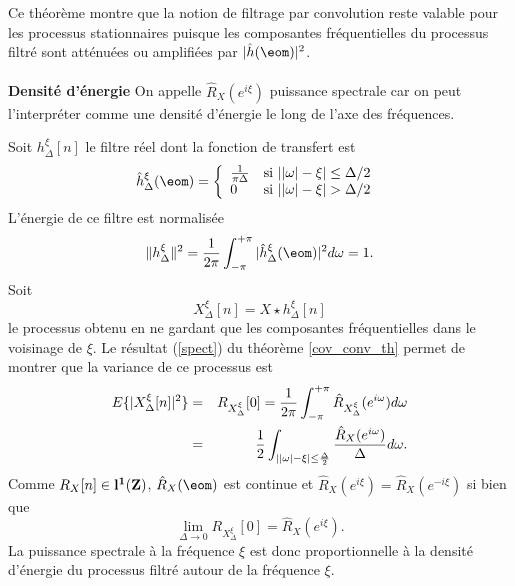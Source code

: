 Ce th\'eor\`eme montre que la notion de filtrage par convolution
reste valable pour les processus stationnaires puisque les
composantes fr\'equentielles du processus filtr\'e sont
att\'enu\'ees ou amplifi\'ees par $|\hat h(\eom)|^2$.
\\
\\
{\bf Densit\'e d'\'energie}
On appelle
$\hat R_X (e^{i \xi})$ puissance spectrale
car on
peut l'interpr\'eter comme une densit\'e d'\'energie
le long de l'axe des fr\'equences.

Soit $h^\xi_\Delta[n]$ le filtre r\'eel 
dont la fonction de transfert est
\[
\hat h_{\Delta}^\xi (\eom) = 
   \left \{ \begin{array}{ll} 
            \frac 1 {\pi \Delta} & 
\mbox{si $| |\om| - \xi| \leq \Delta/2$ }\\
            0 & \mbox{si $| |\om| - \xi | > \Delta/2$}
            \end{array}
   \right.  
\]
L'\'energie de ce filtre est normalis\'ee
\[
\|h_{\Delta}^\xi \|^2 = \frac 1 {2 \pi} \int_{-\pi}^{+\pi}
|\hat h_{\Delta}^\xi (\eom) |^2 d\om = 1 .
\]
Soit 
\[
X^\xi_\Delta [n] = X \star h^\xi_\Delta [n] 
\]
le processus obtenu en ne gardant que les composantes
fr\'equentielles dans le voisinage de $\xi$.
Le r\'esultat (\ref{spect}) du
th\'eor\`eme \ref{cov_conv_th} permet de montrer que
la variance de ce processus est
\begin{eqnarray*}
E\{|X^\xi_\Delta[n]|^2\} &=& R_{X^\xi_\Delta} [0] = \frac 1 {2 \pi} 
\int_{-\pi}^{+\pi}\hat R_{X^\xi_\Delta} (e^{i {\omega}}) d{\omega}\\
& = & \frac 1 2
\int_{||{\omega}| - \xi| \leq \frac {\Delta} 2}
\frac {\hat R_{X} (e^{i {\omega}})} {\Delta} d{\omega} . 
\end{eqnarray*}
Comme $R_X [n] \in {\bf l ^ 1 ({\bf{Z}})}$, $\hat R_X (\eom )$ est continue et
$\hat R_X (e ^{i \xi}) = \hat R_X (e ^{-i \xi})$ si bien que
\[
\lim_{\Delta \rightarrow 0} R_{X^\xi_\Delta} [0] =
\hat R_X(e ^{i \xi})  . 
\]
La puissance spectrale \`a la fr\'equence $\xi$ est 
donc proportionnelle
\`a la densit\'e d'\'energie du processus filtr\'e
autour de la fr\'equence $\xi$.

